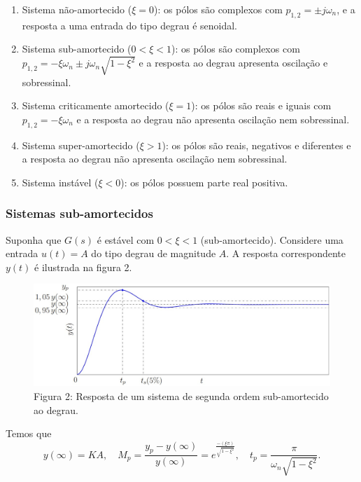 \documentclass[
]{book}
\providecommand{\tightlist}{%
  \setlength{\itemsep}{0pt}\setlength{\parskip}{0pt}}
\begin{document}
\begin{enumerate}
\def\labelenumi{\arabic{enumi}.}
\tightlist
\item
  Sistema não-amortecido (\(\xi = 0\)): os pólos são complexos com \(p_{1,2} = \pm j \omega_n\), e a resposta a uma entrada do tipo degrau é senoidal.
\item
  Sistema sub-amortecido (\(0< \xi <1\)): os pólos são complexos com \(p_{1,2} = - \xi \omega_n \pm j \omega_n\sqrt{1 - \xi^2}\) e a resposta ao degrau apresenta oscilação e sobressinal.
\item
  Sistema criticamente amortecido (\(\xi = 1\)): os pólos são reais e iguais com \(p_{1,2} = -\xi \omega_n\) e a resposta ao degrau não apresenta oscilação nem sobressinal.
\item
  Sistema super-amortecido (\(\xi >1\)): os pólos são reais, negativos e diferentes e a resposta ao degrau não apresenta oscilação nem sobressinal.
\item
  Sistema instável (\(\xi < 0\)): os pólos possuem parte real positiva.
\end{enumerate}

\hypertarget{sistemas-sub-amortecidos}{%
\subsubsection{Sistemas sub-amortecidos}\label{sistemas-sub-amortecidos}}

Suponha que \(G(s)\) é estável com \(0 < \xi < 1\) (sub-amortecido). Considere uma entrada \(u(t) = A\) do tipo degrau de magnitude \(A\). A resposta correspondente \(y(t)\) é ilustrada na figura 2.

\begin{figure}
\centering
\includegraphics{Imagens/Lab3/Explicação/fig2.jpg}
\caption{Figura 2: Resposta de um sistema de segunda ordem sub-amortecido ao degrau.}
\end{figure}

Temos que
\[
y(\infty) = KA, \quad M_p= \frac {y_p-y(\infty)}{y(\infty)} = e^{\frac {-(\xi \pi)}{\sqrt{1-\xi^2}}}, \quad
t_p = \frac {\pi}{\omega_n\sqrt{1-\xi^2}}.
\]
\end{document}
